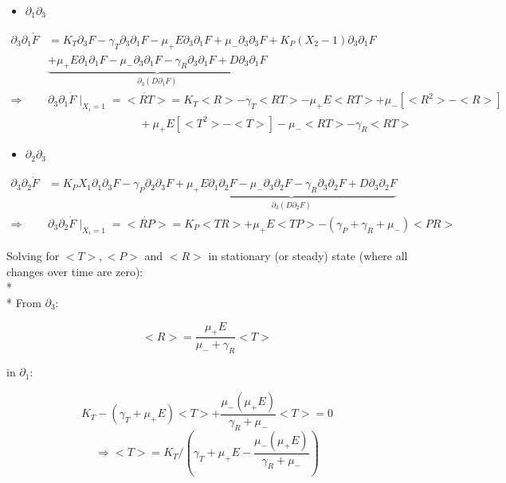 \documentclass{article}
\begin{document}
\begin{itemize}
    \item $\partial_1\partial_3$
\end{itemize}
\begin{align*}
    \partial_3\partial_1\Dot{F} &= K_T\partial_3F - \gamma_T\partial_3\partial_1F - \mu_+E\partial_3\partial_1F + \mu_-\partial_3\partial_3F + K_P(X_2 - 1)\partial_3\partial_1F\\
                                &\underbrace{+ \mu_+E\partial_1\partial_1F - \mu_-\partial_3\partial_1F - \gamma_R\partial_3\partial_1F + D\partial_3\partial_1F}_{\partial_3(D\partial_1F)}\\
                \Longrightarrow & \partial_3\partial_1\Dot{F}\mid_{X_i=1} = <\Dot{RT}> = K_T<R> - \gamma_T<RT> - \mu_+E<RT> + \mu_-[<R^2> - <R>]\\
                                & \hspace{98pt}  +\mu_+E[<T^2> - <T>] - \mu_-<RT> - \gamma_R<RT>
\end{align*}

\begin{itemize}
    \item $\partial_2\partial_3$
\end{itemize}
\begin{align*}
    \partial_3\partial_2\Dot{F} &= K_PX_1\partial_1\partial_3F - \gamma_P\partial_2\partial_3F + \underbrace{\mu_+E\partial_1\partial_2F - \mu_-\partial_3\partial_2F - \gamma_R\partial_3\partial_2F + D\partial_3\partial_2F}_{\partial_3(D\partial_2F)}\\
                \Longrightarrow & \partial_3\partial_2\Dot{F}\mid_{X_i=1} = <\Dot{RP}> = K_P<TR> + \mu_+E<TP> - (\gamma_P + \gamma_R+ \mu_-)<PR> 
\end{align*}

Solving for $<T>, <P>$ and $<R>$ in stationary (or steady) state (where all changes over time are zero): 
\\*
\\*
From $\partial_3$:

\begin{equation*}
    <R> = \frac{\mu_+E}{\mu_- + \gamma_R}<T>
\end{equation*}

in $\partial_1$:

\begin{equation*}
    K_T - (\gamma_T + \mu_+E)<T> + \frac{\mu_-(\mu_+E)}{\gamma_R + \mu_-}<T> = 0
\end{equation*}
\begin{equation*}
    \Longrightarrow <T> = K_T \Bigg/ \left( \gamma_T + \mu_+E - \frac{\mu_-(\mu_+E)}{\gamma_R + \mu_-} \right)
\end{equation*}
\end{document}
